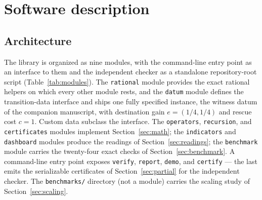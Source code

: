 \documentclass[3p,11pt]{elsarticle}
\begin{document}
\section{Software description}\label{sec:software}

\subsection{Architecture}\label{sec:architecture}

The library is organized as nine modules, with the command-line
entry point as an interface to them and the independent checker as a
standalone repository-root script (Table~\ref{tab:modules}). The
\texttt{rational} module provides the exact rational helpers on which every
other module rests, and the \texttt{datum} module defines the transition-data interface and ships one
fully specified instance, the witness datum of the companion manuscript,
with destination gain $e = (1/4, 1/4)$ and rescue cost $c = 1$. Custom data
subclass the interface. The \texttt{operators}, \texttt{recursion}, and
\texttt{certificates} modules implement Section~\ref{sec:math}; the
\texttt{indicators} and \texttt{dashboard} modules produce the readings of
Section~\ref{sec:readings}; the \texttt{benchmark} module carries the
twenty-four exact checks of Section~\ref{sec:benchmark}. A command-line
entry point exposes \texttt{verify}, \texttt{report}, \texttt{demo}, and
\texttt{certify} --- the last emits the serializable certificates of
Section~\ref{sec:partial} for the independent checker. The
\texttt{benchmarks/} directory (not a module) carries the scaling study
of Section~\ref{sec:scaling}.
\end{document}
